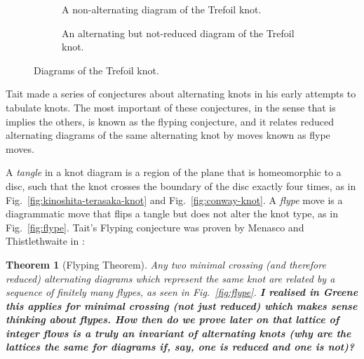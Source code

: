 \documentclass[12pt]{report}
\newcommand{\notered}[1]{{\color{Red} \textbf{#1}}}
\newtheorem*{theorem}{Theorem}
\begin{document}
\begin{figure}[hbt!]
	\centering
	\hspace*{\fill}
	\begin{subfigure}[b]{0.4 \textwidth}
		\centering
		\def\svgscale{0.23}
		
		\caption{A non-alternating diagram of the Trefoil knot.}
		\label{fig:trefoil-nonalternating}
	\end{subfigure}
	\hspace*{\fill} \hspace*{\fill}	\hspace*{\fill}
	\begin{subfigure}[b]{0.4 \textwidth}
		\centering
		\def\svgscale{0.23}
		
		\caption{An alternating but not-reduced diagram of the Trefoil knot.}
		\label{fig:trefoil-nugatory}
	\end{subfigure}
	\hspace*{\fill} 
	\caption{Diagrams of the Trefoil knot.}
	\label{fig:trefoil-diagrams}
\end{figure}

Tait made a series of conjectures about alternating knots in his early attempts to tabulate knots. The most important of these conjectures, in the sense that is implies the others, is known as the flyping conjecture, and it relates reduced alternating diagrams of the same alternating knot by moves known as flype moves.

A \textit{tangle} in a knot diagram is a region of the plane that is homeomorphic to a disc, such that the knot crosses the boundary of the disc exactly four times, as in Fig.~\ref{fig:kinoshita-terasaka-knot} and Fig.~\ref{fig:conway-knot}. A \textit{flype} move is a diagrammatic move that flips a tangle but does not alter the knot type, as in Fig.~\ref{fig:flype}. Tait's Flyping conjecture was proven by Menasco and Thistlethwaite in \cite[p. 166]{classification-alternating-links}:

\begin{theorem}[Flyping Theorem]
	Any two minimal crossing (and therefore reduced) alternating diagrams which represent the same knot are related by a sequence of finitely many flypes, as seen in Fig.~\ref{fig:flype}. \notered{I realised in Greene this applies for minimal crossing (not just reduced) which makes sense thinking about flypes. How then do we prove later on that lattice of integer flows is a truly an invariant of alternating knots (why are the lattices the same for diagrams if, say, one is reduced and one is not)?}
\end{theorem}
\end{document}
